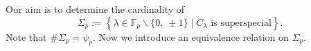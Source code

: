 \documentclass[a4paper, 11pt]{article}
\theoremstyle{plain}
\newtheorem*{thm*}{Theorem}
\newcommand{\?}{\textcolor{red}{??}}
\newcommand{\lm}{\lambda}
\newcommand{\fp}{\mathbb{F}_p}
\begin{document}
\label{theorema}
\thmA*






Our aim is to determine the cardinality of
\[
{\Sigma}_p:=\left\{ \lm \in \fp \smallsetminus\{0,\ \pm1 \} \mid  C_{\lm} \text{ is superspecial} \right\}.
\]
Note that $\# {\Sigma}_p={\psi}_{p}$.
Now we introduce an equivalence relation \textcolor{black}{on} ${\Sigma}_p$.
\end{document}
